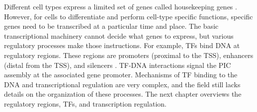     Different cell types express a limited set of genes called housekeeping genes \cite{eisenberg2013human}. However, for cells to differentiate and perform cell-type specific functions, specific genes need to be transcribed at a particular time and place. The basic transcriptional machinery cannot decide what genes to express, but various regulatory processes make those instructions. For example, TFs bind DNA at regulatory regions. These regions are promoters (proximal to the TSS), enhancers (distal from the TSS), and silencers \cite{haberle2016promoter,smith2014enhancer,spitz2012transcription}. TF-DNA interactions signal the PIC assembly at the associated gene promoter. Mechanisms of TF binding to the DNA and transcriptional regulation are very complex, and the field still lacks details on the organization of these processes. The next chapter overviews the regulatory regions, TFs, and transcription regulation.
